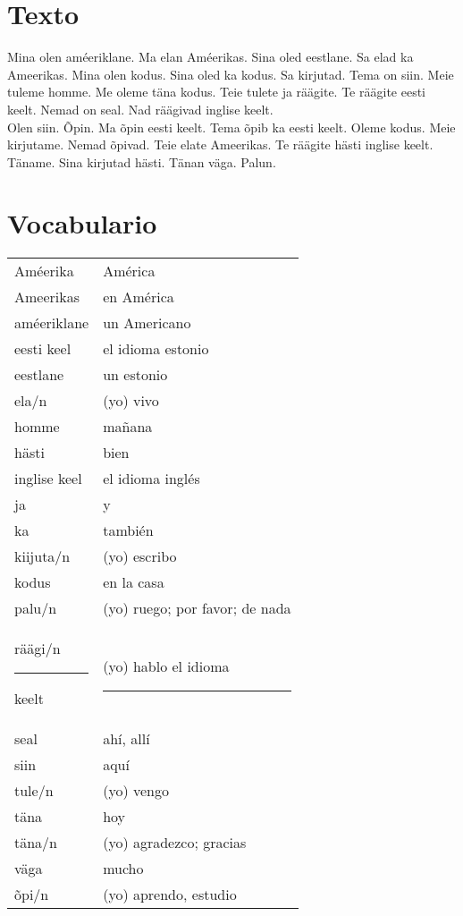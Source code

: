 \Large{\section*{Texto}}

Mina olen améeriklane. Ma elan Améerikas. Sina oled eestlane. Sa elad ka Ameerikas. Mina olen kodus. Sina oled ka kodus. Sa kirjutad. Tema on siin. Meie tuleme homme. Me oleme täna kodus. Teie tulete ja räägite. Te räägite eesti keelt. Nemad on seal. Nad räägivad inglise keelt.\\

Olen siin. Õpin. Ma õpin eesti keelt. Tema õpib ka eesti keelt. Oleme kodus. Meie kirjutame. Nemad õpivad. Teie elate Ameerikas. Te räägite hästi inglise keelt. Täname. Sina kirjutad hästi. Tänan väga. Palun.\\

\Large{\section*{Vocabulario}}

\begin{tabular}{ l l }
	Améerika 							& América \\
	Ameerikas 							& en América \\
	améeriklane 						& un Americano \\
	eesti keel 							& el idioma estonio \\
	eestlane 							& un estonio \\
	ela/n 								& (yo) vivo \\
	homme 								& mañana \\
	hästi 								& bien \\
	inglise keel 						& el idioma inglés \\
	ja 									& y \\
	ka 									& también \\
	kiijuta/n 							& (yo) escribo \\
	kodus 								& en la casa \\
	palu/n 								& (yo) ruego; por favor; de nada \\
	räägi/n	\rule{1cm}{0.4pt} keelt 	& (yo) hablo el idioma \rule{1cm}{0.4pt} \\
	seal 								& ahí, allí \\
	siin 								& aquí \\
	tule/n 								& (yo) vengo \\
	täna 								& hoy \\
	täna/n 								& (yo) agradezco; gracias\\
	väga 								& mucho \\
	õpi/n 								& (yo) aprendo, estudio
\end{tabular}
\bigskip


